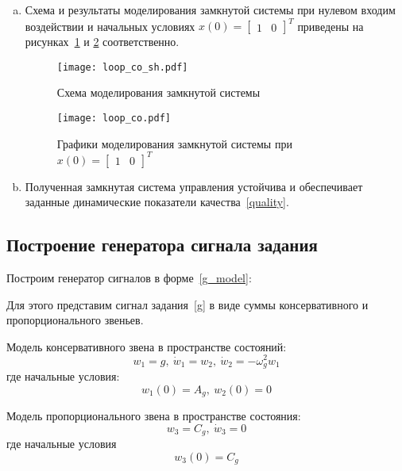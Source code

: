 \begin{enumerate}[a)]
	\item Схема и результаты моделирования замкнутой системы при нулевом входим воздействии и начальных условиях $x(0) = \begin{bmatrix} 1&0\end{bmatrix}^T$ приведены на рисунках~\ref{fg:loop_co_sh} и \ref{fg:loop_co} соответственно.
	\begin{figure}[h!]
		\centering
		\texttt{[image: loop\_co\_sh.pdf]}
		\caption{Схема моделирования замкнутой системы}
		\label{fg:loop_co_sh}
	\end{figure}

	\begin{figure}[h!]
		\centering
		\texttt{[image: loop\_co.pdf]}
		\caption{Графики моделирования замкнутой системы при $x(0) = \begin{bmatrix} 1&0\end{bmatrix}^T$}
		\label{fg:loop_co}
	\end{figure}

	\item Полученная замкнутая система управления устойчива и обеспечивает заданные динамические показатели качества~\eqref{quality}.
\end{enumerate}

\subsection{Построение генератора сигнала задания}

Построим генератор сигналов в форме~\eqref{g_model}:

Для этого представим сигнал задания~\eqref{g} в виде суммы консервативного и пропорционального звеньев.

Модель консервативного звена в пространстве состояний:
\begin{equation}\label{g1}
	w_1 = g,~\dot{w}_1 = w_2,~\dot{w}_2 = - \omega_{g}^2 w_1  
\end{equation}
где начальные условия:
\begin{equation}
	w_1(0) = A_g,~w_2(0) = 0
\end{equation}

Модель пропорционального звена в пространстве состояния:
\begin{equation}\label{g2}
	w_3 = C_g,~\dot{w}_3 = 0
\end{equation}
где начальные условия
\begin{equation}
	w_3(0) = C_g
\end{equation}

